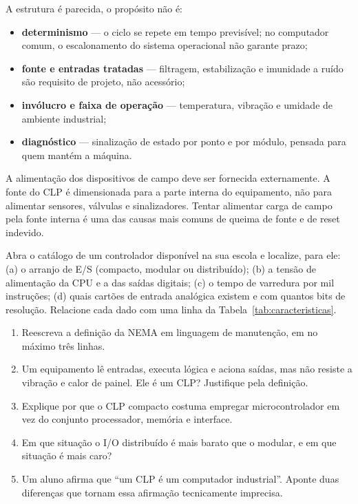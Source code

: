 A estrutura é parecida, o propósito não é:

\begin{itemize}
  \item \textbf{determinismo} --- o ciclo se repete em tempo previsível; no computador comum, o
        escalonamento do sistema operacional não garante prazo;
  \item \textbf{fonte e entradas tratadas} --- filtragem, estabilização e imunidade a ruído são
        requisito de projeto, não acessório;
  \item \textbf{invólucro e faixa de operação} --- temperatura, vibração e umidade de ambiente
        industrial;
  \item \textbf{diagnóstico} --- sinalização de estado por ponto e por módulo, pensada para quem
        mantém a máquina.
\end{itemize}

\begin{atencao}
A alimentação dos dispositivos de campo deve ser fornecida externamente. A fonte do CLP é
dimensionada para a parte interna do equipamento, não para alimentar sensores, válvulas e
sinalizadores. Tentar alimentar carga de campo pela fonte interna é uma das causas mais comuns de
queima de fonte e de reset indevido.
\end{atencao}

\begin{pratica}
Abra o catálogo de um controlador disponível na sua escola e localize, para ele:
(a) o arranjo de E/S (compacto, modular ou distribuído);
(b) a tensão de alimentação da CPU e a das saídas digitais;
(c) o tempo de varredura por mil instruções;
(d) quais cartões de entrada analógica existem e com quantos bits de resolução.
Relacione cada dado com uma linha da Tabela~\ref{tab:caracteristicas}.
\end{pratica}

\begin{exercicios}
\begin{enumerate}[label=\alph*)]
  \item Reescreva a definição da NEMA em linguagem de manutenção, em no máximo três linhas.
  \item Um equipamento lê entradas, executa lógica e aciona saídas, mas não resiste a vibração e
        calor de painel. Ele é um CLP? Justifique pela definição.
  \item Explique por que o CLP compacto costuma empregar microcontrolador em vez do conjunto
        processador, memória e interface.
  \item Em que situação o I/O distribuído é mais barato que o modular, e em que situação é mais caro?
  \item Um aluno afirma que ``um CLP é um computador industrial''. Aponte duas diferenças que
        tornam essa afirmação tecnicamente imprecisa.
\end{enumerate}
\end{exercicios}
